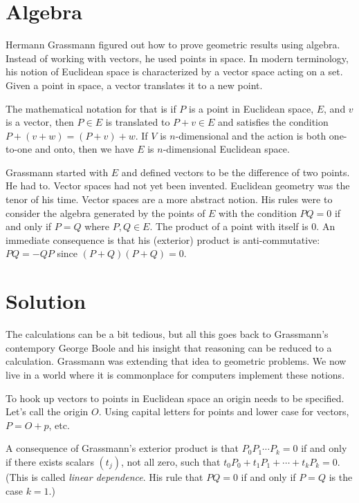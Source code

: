 \documentclass[11pt,fleqn]{article}
\begin{document}
\section{Algebra}
Hermann Grassmann figured out how to prove geometric results using
algebra. Instead of working with vectors, he used points in space.
In modern terminology, his notion of Euclidean space is characterized by a
vector space acting on a set. Given a point in space, a vector translates
it to a new point.

The mathematical notation for that is if \(P\) is a point in Euclidean
space, \(E\), and \(v\) is a vector, then \(P\in E\) is translated
to \(P + v\in E\) and satisfies the condition \(P + (v + w) = (P + v) + w\).
If \(V\) is \(n\)-dimensional and the action is both one-to-one and onto,
then we have \(E\) is \(n\)-dimensional Euclidean space.

Grassmann started with \(E\) and defined vectors to be the difference
of two points. He had to. Vector spaces had not yet been invented.
Euclidean geometry was the tenor of his time. Vector spaces are
a more abstract notion.
His rules were to consider the algebra generated by the points of \(E\)
with the condition \(PQ = 0\) if and only if \(P = Q\) where \(P,Q\in E\). The product of a point with itself is 0. An immediate consequence
is that his (exterior) product is anti-commutative:
\(PQ = -QP\) since \((P + Q)(P + Q) = 0\).

\section{Solution}
The calculations can be a bit tedious, but all this goes back to
Grassmann's contempory George Boole \cite{boole1854} and his insight
that reasoning can be reduced to a calculation. Grassmann was extending
that idea to geometric problems. We now live in a world where
it is commonplace for computers implement these notions.

To hook up vectors to points in Euclidean space an origin needs
to be specified. Let's call the origin \(O\). Using capital letters
for points and lower case for vectors, \(P = O + p\), etc.

A consequence of Grassmann's exterior product is that
\(P_0P_1\cdots P_k = 0\) if and only if there exists
scalars \((t_j)\), not all zero, such that
\(t_0P_0 + t_1P_1 + \cdots + t_kP_k = 0\). (This is called
{\em linear dependence}. His rule that \(PQ = 0\) if and only
if \(P = Q\) is the case \(k = 1\).)
\end{document}
